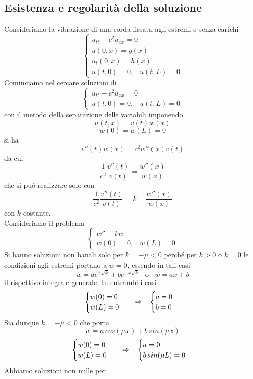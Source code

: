 \subsection{Esistenza e regolarit\`a della soluzione}
Consideriamo la vibrazione di una corda fissata agli estremi e senza carichi
\[
	\left\{
	\begin{array}{l}
		u_{tt} - c^2 u_{xx}= 0 \\
		u(0,x)=g(x) \\
		u_t(0,x)= h(x)\\
		u(t,0)=0, \;\;\; u(t,L)=0
	\end{array}
	\right.
\]
Cominciamo nel cercare soluzioni di
\[
	\left\{
	\begin{array}{l}
		u_{tt} - c^2 u_{xx}= 0 \\
		u(t,0)=0, \;\;\; u(t,L)=0
	\end{array}
	\right.
\]
con il metodo della separazione delle variabili imponendo
\[
	u(t,x)=v(t)w(x)
\]
\[
	w(0)=w(L)=0
\]
si ha
\[
	v''(t)w(x)=c^2w''(x)v(t)
\]
da cui
\[
	\frac{1}{c^2} \frac{v''(t)}{v(t)}= \frac{w''(x)}{w(x)}
\]
che si pu\`o realizzare solo con
\[
	\frac{1}{c^2} \frac{v''(t)}{v(t)}= k = \frac{w''(x)}{w(x)}
\]
con $k$ costante.\\
Consideriamo il problema
\[
	\left\{
	\begin{array}{l}
		w''= kw \\
		w(0)=0, \;\;\; w(L)=0
	\end{array}
	\right.
\]
Si hanno soluzioni non banali solo per $k= -\mu <0$
perch\'e per $k>0$ o $k=0$ le condizioni agli estremi portano a $w=0$,
essendo in tali casi
\[
	w=ae^{x\sqrt{k}} + b e^{-x \sqrt{k}} \;\;\; \text{o} \;\;\;
	w=ax+b
\]
il rispettivo integrale generale. In entrambi i casi
\[
	\begin{cases}
		w(0)=0 \\
		w(L)=0
	\end{cases}
	\;\;\; \Rightarrow \;\;\;
	\begin{cases}
		a=0 \\
		b=0
	\end{cases}
\]
Sia dunque $k=-\mu < 0$ che porta
\[
	w=a \, cos(\mu x) + b \, sin (\mu x)
\]
\[
	\begin{cases}
		w(0)=0 \\
		w(L)=0
	\end{cases}
	\;\;\; \Rightarrow \;\;\;
	\begin{cases}
		a=0 \\
		b \, sin (\mu L)=0
	\end{cases}
\]
Abbiamo soluzioni non nulle per
